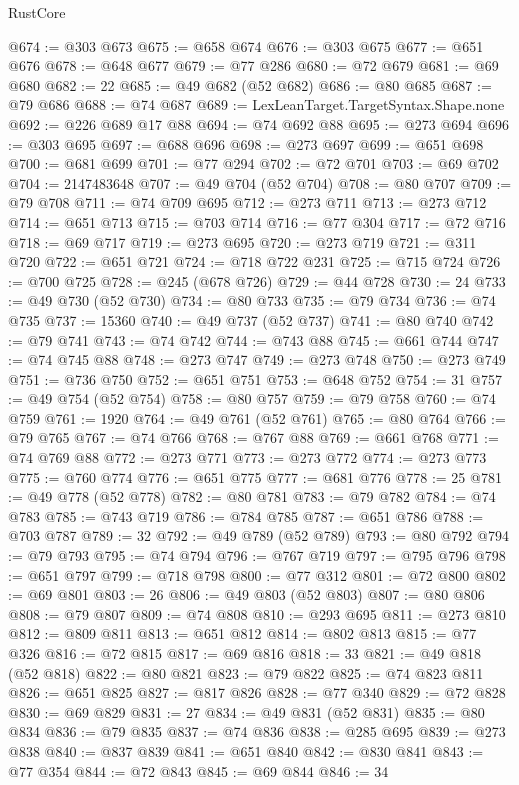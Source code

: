 \begin{lexlean}{RustCore}
\begin{coremodule}
@674 := @303 @673
@675 := @658 @674
@676 := @303 @675
@677 := @651 @676
@678 := @648 @677
@679 := @77 @286
@680 := @72 @679
@681 := @69 @680
@682 := 22
@685 := @49 @682 (@52 @682)
@686 := @80 @685
@687 := @79 @686
@688 := @74 @687
@689 := LexLeanTarget.TargetSyntax.Shape.none
@692 := @226 @689 @17 @88
@694 := @74 @692 @88
@695 := @273 @694
@696 := @303 @695
@697 := @688 @696
@698 := @273 @697
@699 := @651 @698
@700 := @681 @699
@701 := @77 @294
@702 := @72 @701
@703 := @69 @702
@704 := 2147483648
@707 := @49 @704 (@52 @704)
@708 := @80 @707
@709 := @79 @708
@711 := @74 @709 @695
@712 := @273 @711
@713 := @273 @712
@714 := @651 @713
@715 := @703 @714
@716 := @77 @304
@717 := @72 @716
@718 := @69 @717
@719 := @273 @695
@720 := @273 @719
@721 := @311 @720
@722 := @651 @721
@724 := @718 @722 @231
@725 := @715 @724
@726 := @700 @725
@728 := @245 (@678 @726)
@729 := @44 @728
@730 := 24
@733 := @49 @730 (@52 @730)
@734 := @80 @733
@735 := @79 @734
@736 := @74 @735
@737 := 15360
@740 := @49 @737 (@52 @737)
@741 := @80 @740
@742 := @79 @741
@743 := @74 @742
@744 := @743 @88
@745 := @661 @744
@747 := @74 @745 @88
@748 := @273 @747
@749 := @273 @748
@750 := @273 @749
@751 := @736 @750
@752 := @651 @751
@753 := @648 @752
@754 := 31
@757 := @49 @754 (@52 @754)
@758 := @80 @757
@759 := @79 @758
@760 := @74 @759
@761 := 1920
@764 := @49 @761 (@52 @761)
@765 := @80 @764
@766 := @79 @765
@767 := @74 @766
@768 := @767 @88
@769 := @661 @768
@771 := @74 @769 @88
@772 := @273 @771
@773 := @273 @772
@774 := @273 @773
@775 := @760 @774
@776 := @651 @775
@777 := @681 @776
@778 := 25
@781 := @49 @778 (@52 @778)
@782 := @80 @781
@783 := @79 @782
@784 := @74 @783
@785 := @743 @719
@786 := @784 @785
@787 := @651 @786
@788 := @703 @787
@789 := 32
@792 := @49 @789 (@52 @789)
@793 := @80 @792
@794 := @79 @793
@795 := @74 @794
@796 := @767 @719
@797 := @795 @796
@798 := @651 @797
@799 := @718 @798
@800 := @77 @312
@801 := @72 @800
@802 := @69 @801
@803 := 26
@806 := @49 @803 (@52 @803)
@807 := @80 @806
@808 := @79 @807
@809 := @74 @808
@810 := @293 @695
@811 := @273 @810
@812 := @809 @811
@813 := @651 @812
@814 := @802 @813
@815 := @77 @326
@816 := @72 @815
@817 := @69 @816
@818 := 33
@821 := @49 @818 (@52 @818)
@822 := @80 @821
@823 := @79 @822
@825 := @74 @823 @811
@826 := @651 @825
@827 := @817 @826
@828 := @77 @340
@829 := @72 @828
@830 := @69 @829
@831 := 27
@834 := @49 @831 (@52 @831)
@835 := @80 @834
@836 := @79 @835
@837 := @74 @836
@838 := @285 @695
@839 := @273 @838
@840 := @837 @839
@841 := @651 @840
@842 := @830 @841
@843 := @77 @354
@844 := @72 @843
@845 := @69 @844
@846 := 34

\end{coremodule}
\end{lexlean}
